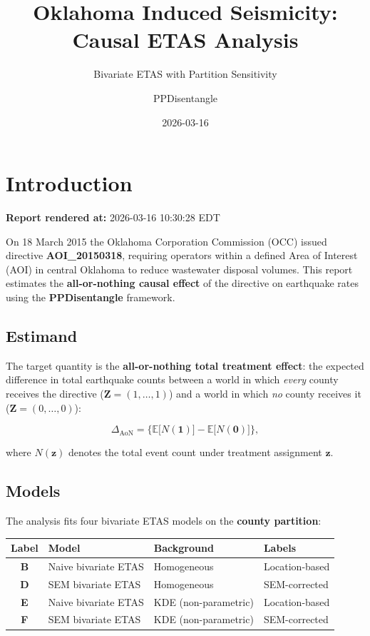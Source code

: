 \documentclass[
]{article}
\title{Oklahoma Induced Seismicity: Causal ETAS Analysis}
\subtitle{Bivariate ETAS with Partition Sensitivity}
\author{PPDisentangle}
\date{2026-03-16}
\renewcommand*\contentsname{Table of contents}
\newcommand\contentsname{Table of contents}
\begin{document}
\maketitle

\renewcommand*\contentsname{Table of contents}
{
\hypersetup{linkcolor=}
\setcounter{tocdepth}{3}
\tableofcontents
}

\section{Introduction}\label{introduction}

\textbf{Report rendered at:} 2026-03-16 10:30:28 EDT

On 18 March 2015 the Oklahoma Corporation Commission (OCC) issued
directive \textbf{AOI\_20150318}, requiring operators within a defined
Area of Interest (AOI) in central Oklahoma to reduce wastewater disposal
volumes. This report estimates the \textbf{all-or-nothing causal effect}
of the directive on earthquake rates using the \textbf{PPDisentangle}
framework.

\subsection{Estimand}\label{estimand}

The target quantity is the \textbf{all-or-nothing total treatment
effect}: the expected difference in total earthquake counts between a
world in which \emph{every} county receives the directive
(\(\mathbf{Z}=(1,\dots,1)\)) and a world in which \emph{no} county
receives it (\(\mathbf{Z}=(0,\dots,0)\)):

\[
\Delta_{\text{AoN}}
= \bigl\{
   \mathbb{E}\!\bigl[N(\mathbf{1})\bigr]
  -\mathbb{E}\!\bigl[N(\mathbf{0})\bigr]
\bigr\},
\]

where \(N(\mathbf{z})\) denotes the total event count under treatment
assignment \(\mathbf{z}\).

\subsection{Models}\label{models}

The analysis fits four bivariate ETAS models on the \textbf{county
partition}:

\begin{longtable}[]{@{}clll@{}}
\toprule\noalign{}
Label & Model & Background & Labels \\
\midrule\noalign{}
\endhead
\bottomrule\noalign{}
\endlastfoot
\textbf{B} & Naive bivariate ETAS & Homogeneous & Location-based \\
\textbf{D} & SEM bivariate ETAS & Homogeneous & SEM-corrected \\
\textbf{E} & Naive bivariate ETAS & KDE (non-parametric) &
Location-based \\
\textbf{F} & SEM bivariate ETAS & KDE (non-parametric) &
SEM-corrected \\
\end{longtable}
\end{document}
